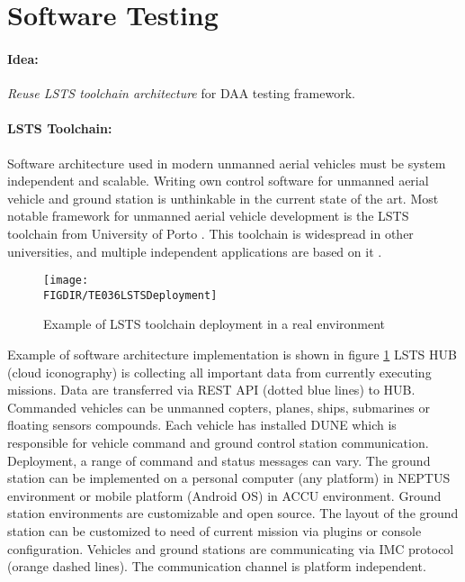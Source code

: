 \section{Software Testing}\label{s:TestingFrameworkTheory}

\paragraph{Idea:} \emph{Reuse LSTS toolchain architecture} for DAA testing framework.

\paragraph{LSTS Toolchain:} Software architecture used in modern unmanned aerial vehicles must be system independent and scalable. Writing own control software for unmanned aerial vehicle and ground station is unthinkable in the current state of the art.  Most notable framework for unmanned aerial vehicle development is the LSTS toolchain from University of Porto \cite{merani2011underwater}. This toolchain is widespread in other universities, and multiple independent applications are based on it \cite{rajan2013towards}.

\begin{figure}[H]
    \centering
    \texttt{[image: \\FIGDIR/TE036LSTSDeployment]}
    \caption{Example of LSTS toolchain deployment in a real environment \cite{pinto2006neptus}}
    \label{fig:lstsdeployment}
\end{figure}

Example of software architecture implementation is shown in figure \ref{fig:lstsdeployment} LSTS HUB (cloud iconography) is collecting all important data from currently executing missions. Data are transferred via REST API (dotted blue lines) to HUB.  Commanded vehicles can be unmanned copters, planes, ships, submarines or floating sensors compounds. Each vehicle has installed DUNE which is responsible for vehicle command and ground control station communication. Deployment, a range of command and status messages can vary. The ground station can be implemented on a personal computer (any platform) in NEPTUS environment or mobile platform (Android OS) in ACCU environment. Ground station environments are customizable and open source. The layout of the ground station can be customized to need of current mission via plugins or console configuration. Vehicles and ground stations are communicating via IMC protocol (orange dashed lines). The communication channel is platform independent.



